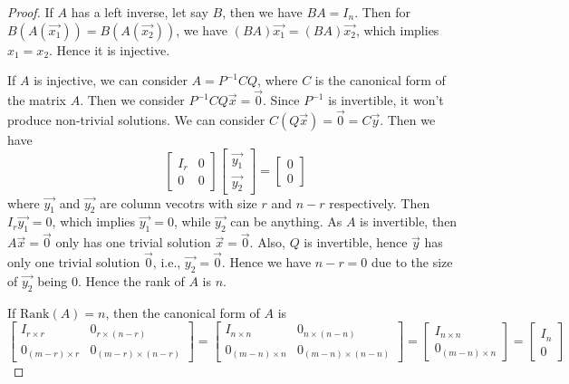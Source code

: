 \documentclass[
	11pt, %
	fleqn, %
	a4paper, %
]{LegrandOrangeBook}
\newcommand{\rank}[1]{\text{Rank}(#1)} %
\begin{document}
\begin{proof}
    If $A$ has a left inverse, let say $B$, then we have $BA = I_n$. Then for $B(A(\vec{x_1})) = B(A(\vec{x_2}))$, we have $(BA)\vec{x_1} = (BA)\vec{x_2}$, which implies $x_1 = x_2$. Hence it is injective.

    If $A$ is injective, we can consider $A = P^{-1}CQ$, where $C$ is the canonical form of the matrix $A$. Then we consider $P^{-1}CQ\vec{x} = \vec{0}$. Since $P^{-1}$ is invertible, it won't produce non-trivial solutions. We can consider $C(Q\vec{x}) = \vec{0} = C\vec{y}$. Then we have 
    \[
        \begin{bmatrix}
            I_r & 0 \\
            0 & 0
        \end{bmatrix} \begin{bmatrix}
            \vec{y_1} \\
            \vec{y_2}
        \end{bmatrix} = \begin{bmatrix}
            0 \\
            0
        \end{bmatrix}
    \]
    where $\vec{y_1}$ and $\vec{y_2}$ are column vecotrs with size $r$ and $n - r$ respectively. Then $I_r \vec{y_1} = 0$, which implies $\vec{y_1} = 0$, while $\vec{y_2}$ can be anything. As $A$ is invertible, then $A\vec{x} = \vec{0}$ only has one trivial solution $\vec{x} = \vec{0}$. Also, $Q$ is invertible, hence $\vec{y}$ has only one trivial solution $\vec{0}$, i.e., $\vec{y_2} = \vec{0}$. Hence we have $n - r = 0$ due to the size of $\vec{y_2}$ being 0. Hence the rank of $A$ is $n$.

    If $\rank{A} = n$, then the canonical form of $A$ is 
    \[
        \begin{bmatrix}
            I_{r \times r} & 0_{r \times (n - r)} \\
            0_{(m - r) \times r} & 0_{(m - r) \times (n - r)}
        \end{bmatrix} = \begin{bmatrix}
            I_{n \times n} & 0_{n \times (n - n)} \\
            0_{(m - n) \times n} & 0_{(m - n) \times (n - n)}
        \end{bmatrix} = \begin{bmatrix}
            I_{n \times n} \\
            0_{(m - n) \times n}
        \end{bmatrix} = \begin{bmatrix}
            I_n \\
            0
        \end{bmatrix} 
    \]


\end{proof}
\end{document}

